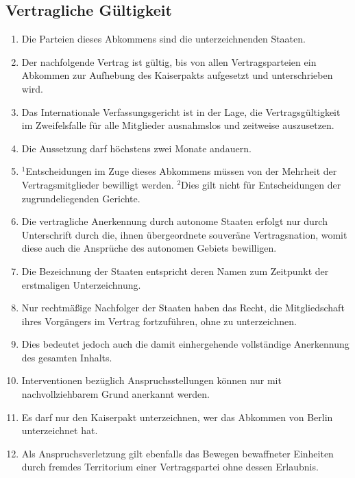 \documentclass{article}
\begin{document}
\subsection{Vertragliche Gültigkeit}
\begin{enumerate}[(1)]
    \item Die Parteien dieses Abkommens sind die unterzeichnenden Staaten.
    \item Der nachfolgende Vertrag ist gültig, bis von allen Vertragsparteien ein Abkommen zur Aufhebung des Kaiserpakts aufgesetzt und unterschrieben wird.
    \item Das Internationale Verfassungsgericht ist in der Lage, die Vertragsgültigkeit im Zweifelsfalle für alle Mitglieder ausnahmslos und zeitweise auszusetzen.
    \item Die Aussetzung darf höchstens zwei Monate andauern.
    \item ${^1}$Entscheidungen im Zuge dieses Abkommens müssen von der Mehrheit der Vertragsmitglieder bewilligt werden. ${^2}$Dies gilt nicht für Entscheidungen der zugrundeliegenden Gerichte.
    \item Die vertragliche Anerkennung durch autonome Staaten erfolgt nur durch Unterschrift durch die, ihnen übergeordnete souveräne Vertragsnation, womit diese auch die Ansprüche des autonomen Gebiets bewilligen.
    \item Die Bezeichnung der Staaten entspricht deren Namen zum Zeitpunkt der erstmaligen Unterzeichnung.
    \item Nur rechtmäßige Nachfolger der Staaten haben das Recht, die Mitgliedschaft ihres Vorgängers im Vertrag fortzuführen, ohne zu unterzeichnen.
    \item Dies bedeutet jedoch auch die damit einhergehende vollständige Anerkennung des gesamten Inhalts.
    \item Interventionen bezüglich Anspruchsstellungen können nur mit nachvollziehbarem Grund anerkannt werden.
    \item Es darf nur den Kaiserpakt unterzeichnen, wer das Abkommen von Berlin unterzeichnet hat.
    \item Als Anspruchsverletzung gilt ebenfalls das Bewegen bewaffneter Einheiten durch fremdes Territorium einer Vertragspartei ohne dessen Erlaubnis.
\end{enumerate}
\end{document}
